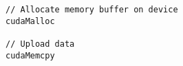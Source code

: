 \lstset{language=C++}
\begin{lstlisting}
// Allocate memory buffer on device
cudaMalloc

// Upload data
cudaMemcpy
\end{lstlisting}